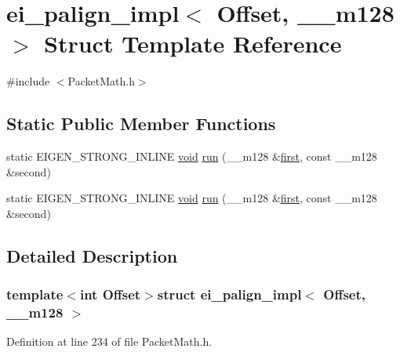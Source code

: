 \hypertarget{structei__palign__impl_3_01_offset_00_01____m128_01_4}{\section{ei\-\_\-palign\-\_\-impl$<$ Offset, \-\_\-\-\_\-m128 $>$ Struct Template Reference}
\label{structei__palign__impl_3_01_offset_00_01____m128_01_4}
}


{\ttfamily \#include $<$Packet\-Math.\-h$>$}

\subsection*{Static Public Member Functions}
\begin{DoxyCompactItemize}
\item 
static E\-I\-G\-E\-N\-\_\-\-S\-T\-R\-O\-N\-G\-\_\-\-I\-N\-L\-I\-N\-E \hyperlink{group___u_a_v_objects_plugin_ga444cf2ff3f0ecbe028adce838d373f5c}{void} \hyperlink{structei__palign__impl_3_01_offset_00_01____m128_01_4_a85f01c9843b633b37c809dcd4f7f8490}{run} (\-\_\-\-\_\-m128 \&\hyperlink{glext_8h_a970a385f6f880f2b620451db4ca4299a}{first}, const \-\_\-\-\_\-m128 \&second)
\item 
static E\-I\-G\-E\-N\-\_\-\-S\-T\-R\-O\-N\-G\-\_\-\-I\-N\-L\-I\-N\-E \hyperlink{group___u_a_v_objects_plugin_ga444cf2ff3f0ecbe028adce838d373f5c}{void} \hyperlink{structei__palign__impl_3_01_offset_00_01____m128_01_4_a85f01c9843b633b37c809dcd4f7f8490}{run} (\-\_\-\-\_\-m128 \&\hyperlink{glext_8h_a970a385f6f880f2b620451db4ca4299a}{first}, const \-\_\-\-\_\-m128 \&second)
\end{DoxyCompactItemize}


\subsection{Detailed Description}
\subsubsection*{template$<$int Offset$>$struct ei\-\_\-palign\-\_\-impl$<$ Offset, \-\_\-\-\_\-m128 $>$}



Definition at line 234 of file Packet\-Math.\-h.



